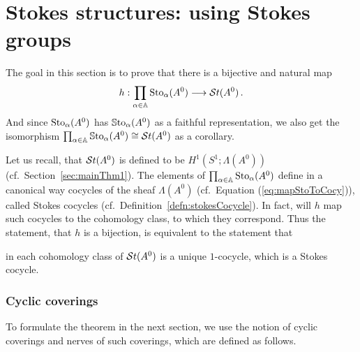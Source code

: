\section{Stokes structures: using Stokes groups}\label{sec:mainThm2}

The goal in this section is to prove that there is a bijective and natural map
\[
  h:\prod_{\alpha\in\mathbb{A}}\operatorname{Sto}_\alpha(A^0)\longrightarrow\mathcal{S}{}t(A^0) \,.
\]
And since $\operatorname{Sto}_\alpha(A^0)$ has $\operatorname{\mathbb{S}to}_\alpha(A^0)$ as a faithful
representation, we also get the isomorphism
$\prod_{\alpha\in\mathbb{A}}\operatorname{\mathbb{S}to}_\alpha(A^0)\cong\mathcal{S}{}t(A^0)$ as a corollary.

Let us recall, that $\mathcal{S}{}t(A^0)$ is defined to be $H^1(S^1;\Lambda(A^0))$
(cf.\ Section~\ref{sec:mainThm1}).
The elements of $\prod_{\alpha\in\mathbb{A}}\operatorname{Sto}_\alpha(A^0)$ define in a canonical way
cocycles of the sheaf $\Lambda(A^0)$ (cf.\ Equation (\ref{eq:mapStoToCocy})),
called Stokes cocycles (cf.\ Definition~\ref{defn:stokesCocycle}).
In fact, will $h$ map such cocycles to the cohomology class, to which they
correspond.
Thus the statement, that $h$ is a bijection, is equivalent to the statement
that
\begin{einr}
  in each cohomology class of $\mathcal{S}{}t(A^0)$ is a unique $1$-cocycle, which is a
  Stokes cocycle.
\end{einr}

\subsubsection{Cyclic coverings}
To formulate the theorem in the next section, we use the notion of cyclic
coverings and nerves of such coverings, which are defined as follows.

